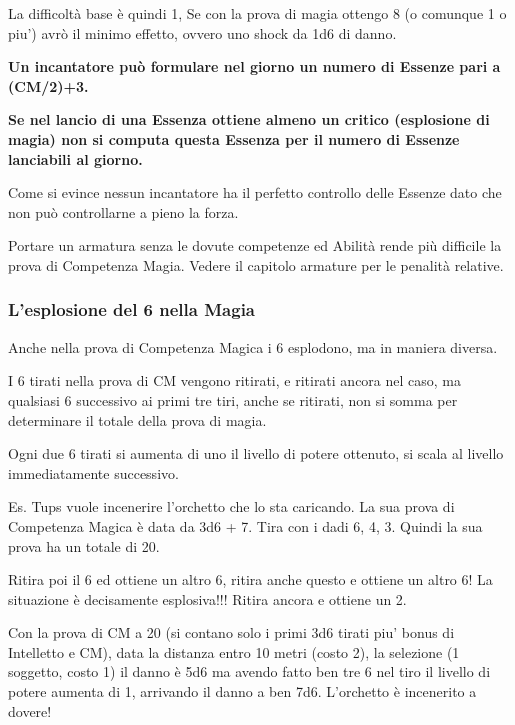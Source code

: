 \documentclass[a4paper,10 pt,twoside,openany]{book}
\begin{document}
La difficoltà base è quindi 1, Se con la prova di magia ottengo 8 (o comunque 1 o piu') avrò il minimo effetto, ovvero uno shock da 1d6 di danno.

\bigskip

\textbf{Un incantatore può formulare nel giorno un numero di Essenze pari a (CM/2)+3.} 

\textbf{Se nel lancio di una Essenza ottiene almeno un critico (esplosione di magia) non si computa questa Essenza per il numero di Essenze lanciabili al giorno.}

Come si evince nessun incantatore ha il perfetto controllo delle Essenze dato che non può controllarne a pieno la forza.

Portare un armatura senza le dovute competenze ed Abilità rende più difficile la prova di Competenza Magia. Vedere il capitolo armature per le penalità relative.

\subsubsection{L'esplosione del 6 nella Magia}

\label{lesplosione-del-6-nella-magia}

Anche nella prova di Competenza Magica i 6 esplodono, ma in maniera diversa.

I 6 tirati nella prova di CM vengono ritirati, e ritirati ancora nel caso, ma qualsiasi 6 successivo ai primi tre tiri, anche se ritirati, non si somma per determinare il totale della prova di magia.

Ogni due 6 tirati si aumenta di uno il livello di potere ottenuto, si scala al livello immediatamente successivo.

Es. Tups vuole incenerire l'orchetto che lo sta caricando. La sua prova di Competenza Magica è data da 3d6 + 7. Tira con i dadi 6, 4, 3. Quindi la sua prova ha un totale di 20.

Ritira poi il 6 ed ottiene un altro 6, ritira anche questo e ottiene un altro 6! La situazione è decisamente esplosiva!!! Ritira ancora e ottiene un 2.

Con la prova di CM a 20 (si contano solo i primi 3d6 tirati piu' bonus di Intelletto e CM), data la distanza entro 10 metri (costo 2), la selezione (1 soggetto, costo 1) il danno è 5d6 ma avendo fatto ben tre 6 nel tiro il livello di potere aumenta di 1, arrivando il danno a ben 7d6. L'orchetto è incenerito a dovere!
\end{document}
